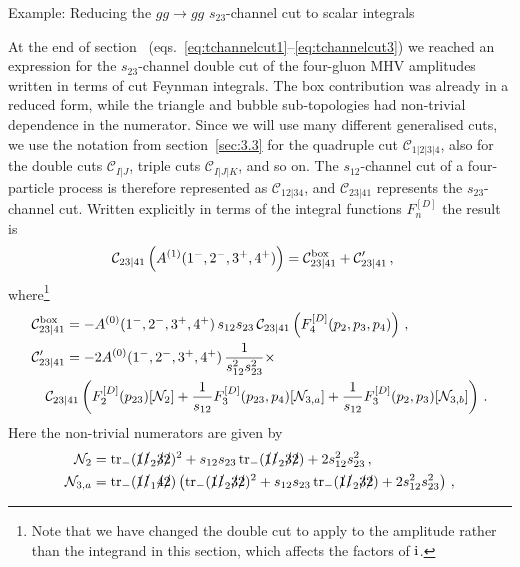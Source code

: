\begin{example}{Example: Reducing the $gg\to gg$ $s_{23}$-channel cut to scalar integrals}

At the end of section~\label{sec:3.2} (eqs.~\eqref{eq:tchannelcut1}--\eqref{eq:tchannelcut3})
we reached an expression for the $s_{23}$-channel double cut of the four-gluon MHV
amplitudes written in terms of cut Feynman integrals. The box contribution was
already in a reduced form, while the triangle and bubble sub-topologies had
non-trivial dependence in the numerator. Since we will use many different
generalised cuts, we use the notation from section~\ref{sec:3.3} for the
quadruple cut $\mathcal{C}_{1|2|3|4}$, also for the double cuts
$\mathcal{C}_{I|J}$, triple cuts $\mathcal{C}_{I|J|K}$, and so on. The
$s_{12}$-channel cut of a four-particle process is therefore represented as
$\mathcal{C}_{12|34}$, and $\mathcal{C}_{23|41}$ represents the $s_{23}$-channel cut.
Written explicitly in terms of the integral functions $F_n^{[D]}$ the result is
\begin{align} \label{eq:4gcut23recall}
  \mathcal{C}_{23|41}&\left( A^{(1)}(1^-,2^-,3^+,4^+) \right)
    = \mathcal{C}^{\rm box}_{23|41} + \mathcal{C}'_{23|41} \,,
\end{align}
where\footnote{Note that we have changed the double cut to apply to the amplitude rather than the integrand in this section, which affects the factors of $\mathrm{i}$.}
\begin{align}
 & \mathcal{C}^{\rm box}_{23|41} = - A^{(0)}(1^-,2^-,3^+,4^+) \, s_{12} s_{23} \, \mathcal{C}_{23|41}\left( F_4^{[D]}(p_2,p_3,p_4) \right) \,, \\
 \label{eq:4gcut23recallCprime}
 &  \mathcal{C}'_{23|41} = - 2 A^{(0)}(1^-,2^-,3^+,4^+) \, \frac{1}{s_{12}^2s_{23}^2} \times \nonumber\\
  & \quad \mathcal{C}_{23|41} \left(
    F_2^{[D]}(p_{23})[\mathcal{N}_2 ]
  + \frac{1}{s_{12}} F_3^{[D]}(p_{23},p_4)[\mathcal{N}_{3,a}]
  + \frac{1}{s_{12}} F_3^{[D]}(p_2,p_3)[\mathcal{N}_{3,b}]
  \right)\,. 
\end{align}
Here the non-trivial numerators are given by
\begin{align}
  \mathcal{N}_2 &= \trmgamtwo1{\slashed{l}_2}32^2 + s_{12}s_{23} \, \trmgamtwo1{\slashed{l}_2}32 + 2 s_{12}^2s_{23}^2 \,, \\
  \mathcal{N}_{3,a} &= \trmgamtwo1{\slashed{l}_1}42 \left(\trmgamtwo1{\slashed{l}_2}32^2 + s_{12}s_{23} \, \trmgamtwo1{\slashed{l}_2}32 + 2 s_{12}^2s_{23}^2 \right) \,, \\

\end{align}
\end{example}
